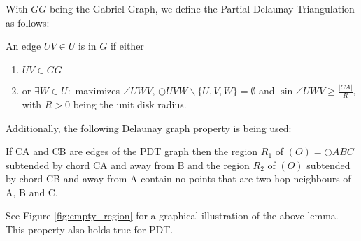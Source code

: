 With $GG $ being the Gabriel Graph, we define the Partial Delaunay Triangulation as follows:
\begin{definition}
\label{pdt-def}
An edge $UV \in U $ is in $G $ if either 
\begin{enumerate}
\renewcommand{\labelenumi}{(\roman{enumi})}
 \item $UV \in GG $
 \item or $\exists{W} \in U : $ maximizes $\angle{UWV} $, $\bigcirc{UVW}  \backslash \{U, V, W\} = \emptyset $ and $\sin{\angle{UWV}} \geq\frac{|CA|}{R} $, with $R>0 $ being the unit disk radius.
\end{enumerate} 
\end{definition}


Additionally, the following Delaunay graph property is being used:
\begin{lemma}
\label{emptyregion}
If CA and CB are edges of the PDT graph then the region $R_1 $ of $(O)=\bigcirc{ABC} $ subtended by chord CA and away from B and the region $R_2 $ of $(O) $ subtended by chord CB and away from A contain no points that are two hop neighbours of A, B and C.
\end{lemma}


See Figure \ref{fig:empty_region} for a graphical illustration of the above lemma.
This property also holds true for PDT.


